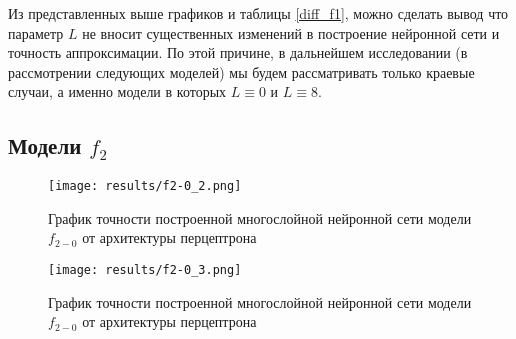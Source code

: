Из представленных выше графиков и таблицы \ref{diff_f1}, можно сделать вывод что параметр $L$ не вносит существенных изменений в построение нейронной сети и точность аппроксимации. По этой причине, в дальнейшем исследовании (в рассмотрении следующих моделей) мы будем рассматривать только краевые случаи, а именно модели в которых $L \equiv 0$ и $L \equiv 8$. 

\subsection{Модели $f_{2}$}
  
  
  
  
  \begin{figure}[H]
  	\texttt{[image: results/f2-0\_2.png]}
  	
  	\caption{График точности построенной многослойной нейронной сети модели $f_{2-0}$ от архитектуры перцептрона}
  	
  \end{figure}
  
  
  \begin{figure}[H]
  	\texttt{[image: results/f2-0\_3.png]}
  	
  	\caption{График точности построенной многослойной нейронной сети модели $f_{2-0}$ от архитектуры перцептрона}	
  \end{figure}

	
